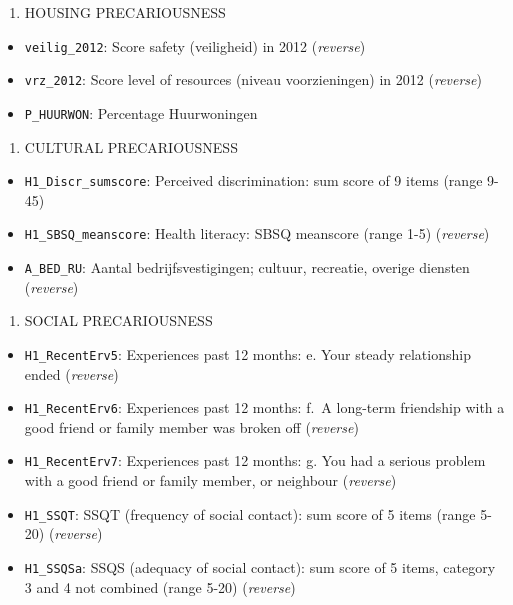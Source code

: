 \documentclass[
]{article}
\providecommand{\tightlist}{%
  \setlength{\itemsep}{0pt}\setlength{\parskip}{0pt}}\usepackage{longtable,booktabs,array}
\begin{document}
\begin{enumerate}
\def\labelenumi{\arabic{enumi}.}
\setcounter{enumi}{2}
\tightlist
\item
  HOUSING PRECARIOUSNESS
\end{enumerate}

\begin{itemize}
\tightlist
\item
  \texttt{veilig\_2012}: Score safety (veiligheid) in 2012
  (\emph{reverse})
\item
  \texttt{vrz\_2012}: Score level of resources (niveau voorzieningen) in
  2012 (\emph{reverse})
\item
  \texttt{P\_HUURWON}: Percentage Huurwoningen
\end{itemize}

\begin{enumerate}
\def\labelenumi{\arabic{enumi}.}
\setcounter{enumi}{3}
\tightlist
\item
  CULTURAL PRECARIOUSNESS
\end{enumerate}

\begin{itemize}
\tightlist
\item
  \texttt{H1\_Discr\_sumscore}: Perceived discrimination: sum score of 9
  items (range 9-45)
\item
  \texttt{H1\_SBSQ\_meanscore}: Health literacy: SBSQ meanscore (range
  1-5) (\emph{reverse})
\item
  \texttt{A\_BED\_RU}: Aantal bedrijfsvestigingen; cultuur, recreatie,
  overige diensten (\emph{reverse})
\end{itemize}

\begin{enumerate}
\def\labelenumi{\arabic{enumi}.}
\setcounter{enumi}{4}
\tightlist
\item
  SOCIAL PRECARIOUSNESS
\end{enumerate}

\begin{itemize}
\tightlist
\item
  \texttt{H1\_RecentErv5}: Experiences past 12 months: e. Your steady
  relationship ended (\emph{reverse})
\item
  \texttt{H1\_RecentErv6}: Experiences past 12 months: f.~A long-term
  friendship with a good friend or family member was broken off
  (\emph{reverse})
\item
  \texttt{H1\_RecentErv7}: Experiences past 12 months: g. You had a
  serious problem with a good friend or family member, or neighbour
  (\emph{reverse})
\item
  \texttt{H1\_SSQT}: SSQT (frequency of social contact): sum score of 5
  items (range 5-20) (\emph{reverse})
\item
  \texttt{H1\_SSQSa}: SSQS (adequacy of social contact): sum score of 5
  items, category 3 and 4 not combined (range 5-20) (\emph{reverse})
\end{itemize}
\end{document}
